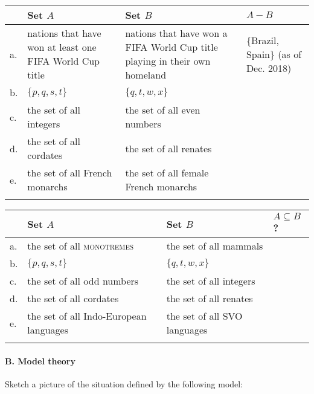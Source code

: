 {\vspace*{1cm}
\noindent
\begin{tabularx}{\textwidth}{lQQQ}
\lsptoprule
 & Set $A$ & Set $B$ & $A-B$\\
 \midrule
a. & nations that have won at least one FIFA World Cup title & nations that have won a FIFA World Cup title playing in their own homeland
& \{Brazil, Spain\} (as of Dec. 2018) \\
\tablevspace
b. & $\{p,q,s,t\}$ & $\{q,t,w,x\}$ & \\
\tablevspace
c. & the set of all integers & the set of all even numbers & \\
\tablevspace
d. & the set of all cordates & the set of all renates & \\
\tablevspace
e. & the set of all {French} monarchs & the set of all female {French} monarchs & \\
\lspbottomrule
\end{tabularx}
\bigskip 

\noindent
\begin{tabularx}{\textwidth}{lQQl}
\lsptoprule
&  Set $A$ & Set $B$ & $A \subseteq B$?\\
\midrule
a. & the set of all \textsc{monotremes} &  the set of all mammals & \\
\tablevspace

b. & $\{p,q,s,t\}$ & $\{q,t,w,x\}$ & \\
\tablevspace

c. & the set of all odd numbers & the set of all integers & \\
\tablevspace

d. & the set of all cordates & the set of all renates & \\
\tablevspace

e. & the set of all Indo-European  languages & the set of all SVO languages & \\
\lspbottomrule
\end{tabularx}

\bigskip


\paragraph*{B. Model theory}
\ea Sketch a picture of the situation defined by the following model:


}
